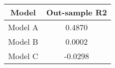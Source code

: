 \begin{tabular}{cc}
\hline
  Model  &  Out-sample R2  \\
\hline
 Model A &     0.4870      \\
 Model B &     0.0002      \\
 Model C &     -0.0298     \\
\hline
\end{tabular}